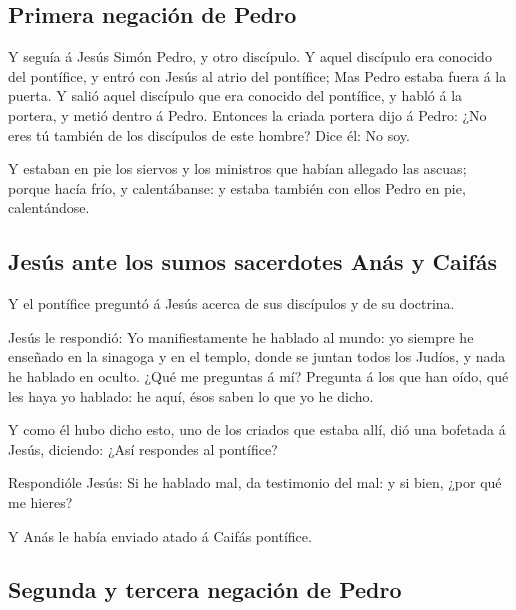 \hypertarget{primera-negaciuxf3n-de-pedro}{%
\subsection{Primera negación de
Pedro}\label{primera-negaciuxf3n-de-pedro}}

 Y seguía á Jesús Simón Pedro, y otro discípulo. Y aquel
discípulo era conocido del pontífice, y entró con Jesús al atrio del
pontífice;  Mas Pedro estaba fuera á la puerta. Y salió
aquel discípulo que era conocido del pontífice, y habló á la portera, y
metió dentro á Pedro.  Entonces la criada portera dijo á
Pedro: ¿No eres tú también de los discípulos de este hombre? Dice él: No
soy.

 Y estaban en pie los siervos y los ministros que habían
allegado las ascuas; porque hacía frío, y calentábanse: y estaba también
con ellos Pedro en pie, calentándose.

\hypertarget{jesuxfas-ante-los-sumos-sacerdotes-anuxe1s-y-caifuxe1s}{%
\subsection{Jesús ante los sumos sacerdotes Anás y
Caifás}\label{jesuxfas-ante-los-sumos-sacerdotes-anuxe1s-y-caifuxe1s}}

 Y el pontífice preguntó á Jesús acerca de sus discípulos y
de su doctrina.

 Jesús le respondió: Yo manifiestamente he hablado al
mundo: yo siempre he enseñado en la sinagoga y en el templo, donde se
juntan todos los Judíos, y nada he hablado en oculto.  ¿Qué
me preguntas á mí? Pregunta á los que han oído, qué les haya yo hablado:
he aquí, ésos saben lo que yo he dicho.

 Y como él hubo dicho esto, uno de los criados que estaba
allí, dió una bofetada á Jesús, diciendo: ¿Así respondes al pontífice?

 Respondióle Jesús: Si he hablado mal, da testimonio del
mal: y si bien, ¿por qué me hieres?

 Y Anás le había enviado atado á Caifás pontífice.

\hypertarget{segunda-y-tercera-negaciuxf3n-de-pedro}{%
\subsection{Segunda y tercera negación de
Pedro}\label{segunda-y-tercera-negaciuxf3n-de-pedro}}

